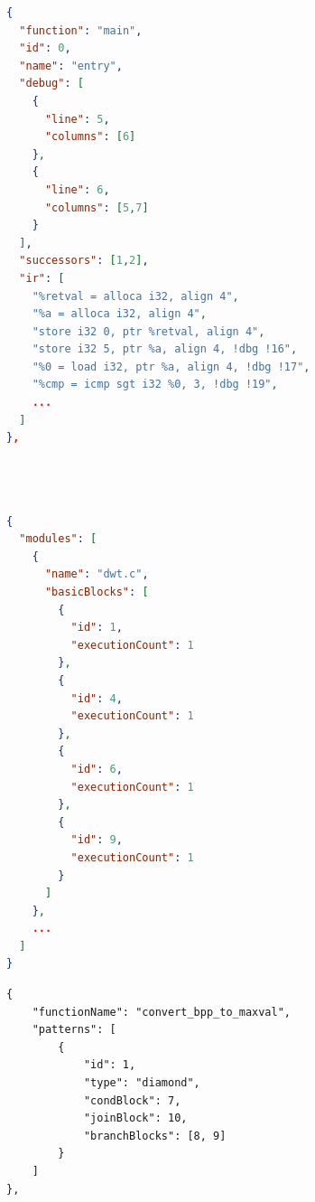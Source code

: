 \begin{figure}[t]
    \centering
    \begin{minipage}[t]{.48\textwidth}
        \centering
        \begin{lstlisting}[language=json, aboveskip=-7mm, caption={One basic block object, produced by the instrumentation pass, in the
JSON format. It contains the name of the
block, source code location information, IDs
of its successors, and the LLVM IR instructions excluding debugger intrinsic instructions which do not compile into any object code instructions.}, label={lst:bb-json}]
{
  "function": "main",
  "id": 0,
  "name": "entry",
  "debug": [
    {
      "line": 5,
      "columns": [6]
    },
    {
      "line": 6,
      "columns": [5,7]
    }
  ],
  "successors": [1,2],
  "ir": [
    "%retval = alloca i32, align 4",
    "%a = alloca i32, align 4",
    "store i32 0, ptr %retval, align 4",
    "store i32 5, ptr %a, align 4, !dbg !16",
    "%0 = load i32, ptr %a, align 4, !dbg !17",
    "%cmp = icmp sgt i32 %0, 3, !dbg !19",
    ...
  ]
},
        \end{lstlisting}
    \end{minipage}\hfill
    \begin{minipage}[t]{.48\textwidth}
        \centering
        \begin{lstlisting}[language=json, aboveskip=-7mm, caption={One module in the JSON
profile containing the IDs and execution counts
of basic blocks which were executed at least
once.}, label={lst:profile-json}]



{
  "modules": [
    {
      "name": "dwt.c",
      "basicBlocks": [
        {
          "id": 1,
          "executionCount": 1
        },
        {
          "id": 4,
          "executionCount": 1
        },
        {
          "id": 6,
          "executionCount": 1
        },
        {
          "id": 9,
          "executionCount": 1
        }
      ]
    },
    ...
  ]
}
        \end{lstlisting}
    \end{minipage}
\end{figure}



\begin{figure}
    \centering
    \begin{lstlisting}[label={lst:pattern-json}, caption = {A JSON object of a Diamond patterns in the \texttt{convert\_bpp\_to\_maxval} function.}]
{
    "functionName": "convert_bpp_to_maxval",
    "patterns": [
        {
            "id": 1,
            "type": "diamond",
            "condBlock": 7,
            "joinBlock": 10,
            "branchBlocks": [8, 9]
        }
    ]
},

    \end{lstlisting}
\end{figure}





